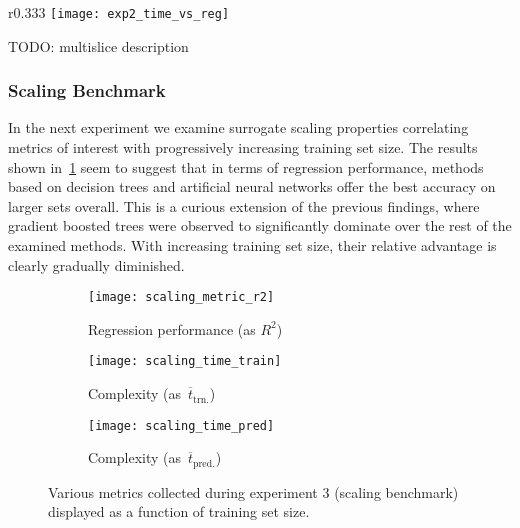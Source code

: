 \newpage
\begin{wrapfigure}{r}{0.333\textwidth}
	\centering
	\vspace{-3ex}
	\texttt{[image: exp2\_time\_vs\_reg]}
	\caption{Results of experiment~2, plotted analogously
	to~\cref{fig:exp1-time-vs-reg}.}
	\label{fig:exp2-time-vs-reg}
	\vspace{-4ex}
\end{wrapfigure}

TODO: multislice description

\subsubsection{Scaling Benchmark}

In the next experiment we examine surrogate scaling properties correlating
metrics of interest with progressively increasing training set size. The results
shown in~\cref{fig:scaling} seem to suggest that in terms of regression performance,
methods based on decision trees and artificial neural networks offer the best accuracy on
larger sets overall. This is a curious extension of the previous findings, where
gradient boosted trees were observed to significantly dominate over the rest of
the examined methods. With increasing training set size, their relative advantage is
clearly gradually diminished.

\begin{figure}[h]
	\centering
	\begin{subfigure}[b]{0.333\textwidth}
		\centering
		\texttt{[image: scaling\_metric\_r2]}
		\caption{Regression performance (as $R^2$)}
	\end{subfigure}\hfill%
	\begin{subfigure}[b]{0.333\textwidth}
		\centering
		\texttt{[image: scaling\_time\_train]}
		\caption{Complexity (as~$\overline{t}_{\text{trn.}}$)}
	\end{subfigure}\hfill%
	\begin{subfigure}[b]{0.333\textwidth}
		\centering
		\texttt{[image: scaling\_time\_pred]}
		\caption{Complexity (as~$\overline{t}_{\text{pred.}}$)}
	\end{subfigure}
	\caption{Various metrics collected during experiment 3 (scaling
	benchmark) displayed as a function of training set size.}
	\label{fig:scaling}
\end{figure}

